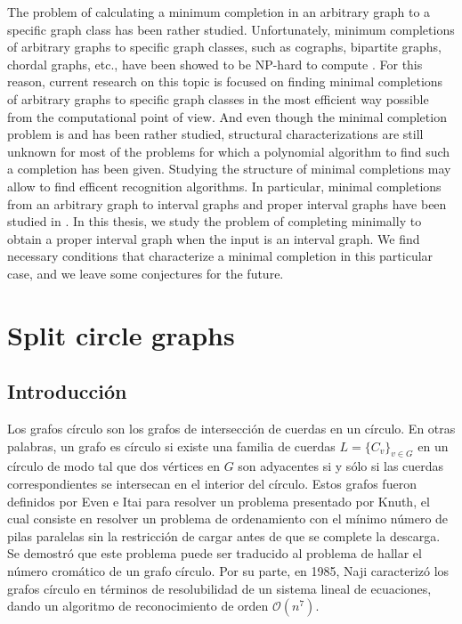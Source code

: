 \documentclass[12pt]{book}
\theoremstyle{plain}
\theoremstyle{remark}
\begin{document}
The problem of calculating a minimum completion in an arbitrary graph to a specific graph class has been rather studied. Unfortunately, minimum completions of arbitrary graphs to specific graph classes, such as cographs, bipartite graphs, chordal graphs, etc., have been showed to be NP-hard to compute \cite{NSS01,BBD06,Y81}. 
For this reason, current research on this topic is focused on finding minimal completions of arbitrary graphs to specific graph classes in the most efficient way possible from the computational point of view. And even though the minimal completion problem is and has been rather studied, structural characterizations are still unknown for most of the problems for which a polynomial algorithm to find such a completion has been given. Studying the structure of minimal completions may allow to find efficent recognition algorithms.
In particular, minimal completions from an arbitrary graph to interval graphs and proper interval graphs have been studied in \cite{CT13,RST06}.
In this thesis, we study the problem of completing minimally to obtain a proper interval graph when the input is an interval graph. We find necessary conditions that characterize a minimal completion in this particular case, and we leave some conjectures for the future.


\part{Split circle graphs}



%
\chapter*{Introducción}

Los grafos círculo \cite{EI71} son los grafos de intersección de cuerdas en un círculo. En otras palabras, un grafo es círculo si existe una familia de cuerdas $L= \{ C_v \}_{v\in G}$ en un círculo de modo tal que dos vértices en $G$ son adyacentes si y sólo si las cuerdas correspondientes se intersecan en el interior del círculo. 
Estos grafos fueron definidos por Even e Itai \cite{EI71} para resolver un problema presentado por Knuth, el cual consiste en resolver un problema de ordenamiento con el mínimo número de pilas paralelas sin la restricción de cargar antes de que se complete la descarga. Se demostró que este problema puede ser traducido al problema de hallar el número cromático de un grafo círculo. 
Por su parte, en 1985, Naji \cite{N85} caracterizó los grafos círculo en términos de resolubilidad de un sistema lineal de ecuaciones, dando un algoritmo de reconocimiento de orden $\mathcal{O}(n^7)$.
\end{document}
